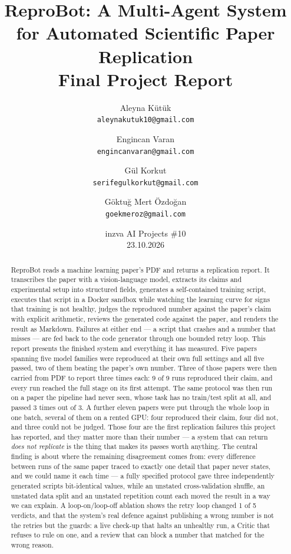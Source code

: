 \documentclass[10pt,twocolumn]{article}
\title{\textbf{ReproBot: A Multi-Agent System for Automated Scientific Paper Replication}\\[0.4em]
\large Final Project Report}
\author{
  Aleyna Kütük \\ \small\texttt{aleynakutuk10@gmail.com}
  \and
  Engincan Varan \\ \small\texttt{engincanvaran@gmail.com}
  \and
  Gül Korkut \\ \small\texttt{serifegulkorkut@gmail.com}
  \and
  Göktuğ Mert Özdoğan \\ \small\texttt{goekmeroz@gmail.com}
}
\date{inzva AI Projects \#10 \\ 23.10.2026}
\begin{document}
\maketitle

\begin{abstract}
ReproBot reads a machine learning paper's PDF and returns a replication report. It transcribes
the paper with a vision-language model, extracts its claims and experimental setup into
structured fields, generates a self-contained training script, executes that script in a Docker
sandbox while watching the learning curve for signs that training is not healthy, judges the
reproduced number against the paper's claim with explicit arithmetic, reviews the generated code
against the paper, and renders the result as Markdown. Failures at either end --- a script that
crashes and a number that misses --- are fed back to the code generator through one bounded
retry loop. This report presents the finished system and everything it has measured. Five papers
spanning five model families were reproduced at their own full settings and all five passed,
two of them beating the paper's own number. Three of those papers were then carried from PDF to
report three times each: 9 of 9 runs reproduced their claim, and every run reached the full stage
on its first attempt. The same protocol was then run on a paper the pipeline had never seen,
whose task has no train/test split at all, and passed 3 times out of 3. A further eleven papers
were put through the whole loop in one batch, several of them on a rented GPU: four reproduced
their claim, four did not, and three could not be judged. Those four are the first replication
failures this project has reported, and they matter more than their number --- a system that can
return \emph{does not replicate} is the thing that makes its passes worth anything. The central
finding is about where the remaining disagreement comes from: every difference between runs of
the same paper traced to exactly one detail that paper never states, and we could name it each
time --- a fully specified protocol gave three independently generated scripts bit-identical
values, while an unstated cross-validation shuffle, an unstated data split and an unstated
repetition count each moved the result in a way we can explain. A loop-on/loop-off ablation
shows the retry loop changed 1 of 5 verdicts, and that the system's real defence against
publishing a wrong number is not the retries but the guards: a live check-up that halts an
unhealthy run, a Critic that refuses to rule on one, and a review that can block a number that
matched for the wrong reason.
\end{abstract}
\end{document}
